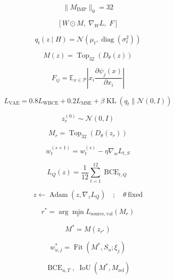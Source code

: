 \[\|M_{\mathrm{IMP}}\|_0=32\]

\[[W\odot M,\;\nabla_W L,\;F]\]

\[q_t(z\mid H)=\mathcal{N}(\mu_t,\operatorname{diag}(\sigma_t^2))\]

\[M(z)=\operatorname{Top}_{32}(D_\theta(z))\]

\[F_{ij}=\mathbb{E}_{x\in\mathcal{P}}\left|x_i\frac{\partial\psi_j(x)}{\partial x_i}\right|\]

\[L_{\mathrm{VAE}}=0.8L_{\mathrm{WBCE}}+0.2L_{\mathrm{MSE}}+\beta\operatorname{KL}(q_t\|\mathcal{N}(0,I))\]

\[z_r^{(0)}\sim\mathcal{N}(0,I)\]

\[M_r=\operatorname{Top}_{32}(D_\theta(z_r))\]

\[w_t^{(s+1)}=w_t^{(s)}-\eta\nabla_w L_{t,S}\]

\[L_Q(z)=\frac{1}{12}\sum_{t=1}^{12}\operatorname{BCE}_{t,Q}\]

\[z\leftarrow\operatorname{Adam}(z,\nabla_z L_Q)\quad;\quad\theta\ \mathrm{fixed}\]

\[r^*=\arg\min_r L_{\mathrm{source,val}}(M_r)\]

\[M^*=M(z_{r^*})\]

\[w_{u,j}^*=\operatorname{Fit}(M^*,S_u;\xi_j)\]

\[\operatorname{BCE}_{u,T},\;\operatorname{IoU}(M^*,M_{\mathrm{ref}})\]
